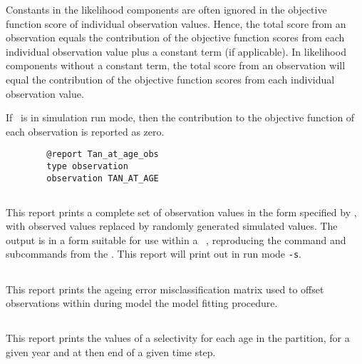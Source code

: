 Constants in the likelihood components are often ignored in the objective function score of individual observation values. Hence, the total score from an observation equals the contribution of the objective function scores from each individual observation value plus a constant term (if applicable). In likelihood components without a constant term, the total score from an observation will equal the contribution of the objective function scores from each individual observation value.

If \CNAME\ is in simulation run mode, then the contribution to the objective function of each observation is reported as zero.

\begin{verbatim}
		@report Tan_at_age_obs
		type observation
		observation TAN_AT_AGE
\end{verbatim}

\subsection{}\label{sec:Report-SimulatedObservation}

This report prints a complete set of observation values in the form specified by , with observed values replaced by randomly generated simulated values. The output is in a form  suitable for use within a \CNAME\ \config, reproducing the command and subcommands from the \config. This report will print out in run mode \texttt{-s}.

\subsection{}\label{sec:Report-AgeingErrorMatrix}

This report prints the ageing error misclassification matrix used to offset observations within during model the model fitting procedure.

\subsection{}\label{sec:Report-Selectivity}

This report prints the values of a selectivity for each age in the partition, for a given year and at then end of a given time step.

